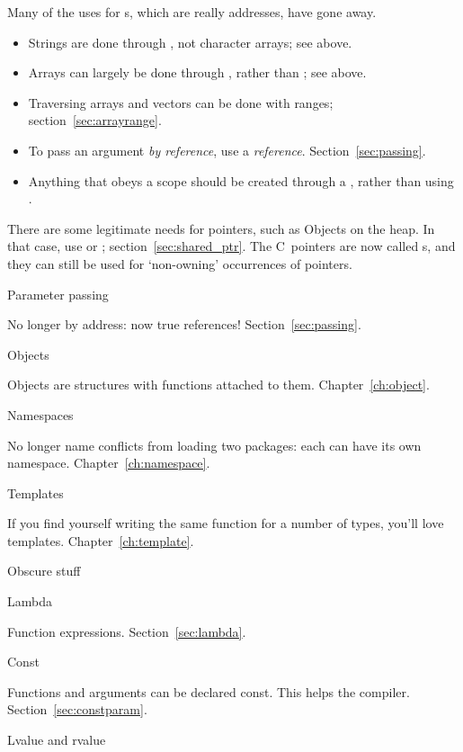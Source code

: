 Many of the uses for s, which are
really addresses, have gone away.
\begin{itemize}
\item Strings are done through , not character arrays;
  see above.
\item Arrays can largely be done through , rather than
  ; see above.
\item Traversing arrays and vectors can be done with ranges;
  section~\ref{sec:arrayrange}.
\item To pass an argument
  \emph{by reference},
  use a \emph{reference}.
  Section~\ref{sec:passing}.
\item Anything that obeys a scope should be created through a
  , rather than using .
\end{itemize}

There are some legitimate needs for pointers, such as Objects on the
heap. In that case, use  or ;
section~\ref{sec:shared_ptr}.
The C~pointers are now called s, and they
can still be used for `non-owning' occurrences of pointers.

 {Parameter passing}

No longer by address: now true references! Section~\ref{sec:passing}.

 {Objects}

Objects are structures with functions attached to
them. Chapter~\ref{ch:object}.

 {Namespaces}

No longer name conflicts from loading two packages: each can have its
own namespace. Chapter~\ref{ch:namespace}.

 {Templates}

If you find yourself writing the same function for a number of types,
you'll love templates. Chapter~\ref{ch:template}.

 {Obscure stuff}

 {Lambda}

Function expressions.
Section~\ref{sec:lambda}.

 {Const}

Functions and arguments can be declared const. This helps the
compiler. Section~\ref{sec:constparam}.

 {Lvalue and rvalue}

